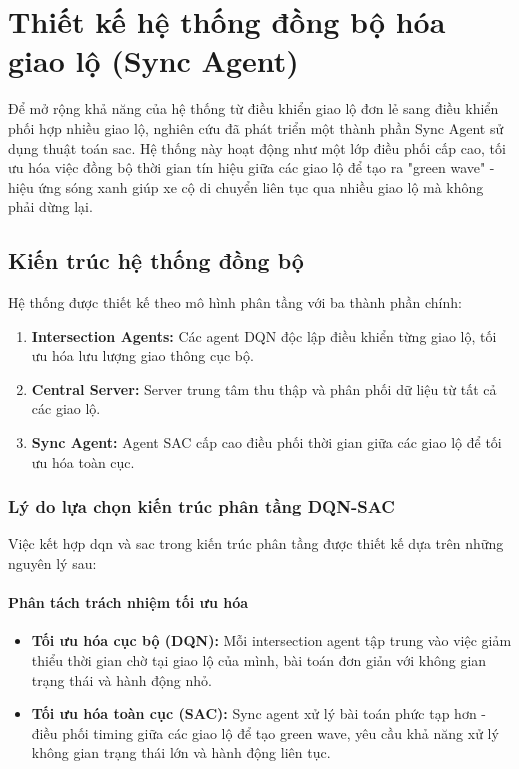 \section{Thiết kế hệ thống đồng bộ hóa giao lộ (Sync Agent)}

Để mở rộng khả năng của hệ thống từ điều khiển giao lộ đơn lẻ sang điều khiển phối hợp nhiều giao lộ, nghiên cứu đã phát triển một thành phần Sync Agent sử dụng thuật toán \ac{sac}. Hệ thống này hoạt động như một lớp điều phối cấp cao, tối ưu hóa việc đồng bộ thời gian tín hiệu giữa các giao lộ để tạo ra "green wave" - hiệu ứng sóng xanh giúp xe cộ di chuyển liên tục qua nhiều giao lộ mà không phải dừng lại.

\subsection{Kiến trúc hệ thống đồng bộ}
Hệ thống được thiết kế theo mô hình phân tầng với ba thành phần chính:

\begin{enumerate}
    \item \textbf{Intersection Agents:} Các agent DQN độc lập điều khiển từng giao lộ, tối ưu hóa lưu lượng giao thông cục bộ.

    \item \textbf{Central Server:} Server trung tâm thu thập và phân phối dữ liệu từ tất cả các giao lộ.

    \item \textbf{Sync Agent:} Agent SAC cấp cao điều phối thời gian giữa các giao lộ để tối ưu hóa toàn cục.
\end{enumerate}

\subsubsection{Lý do lựa chọn kiến trúc phân tầng DQN-SAC}
Việc kết hợp \ac{dqn} và \ac{sac} trong kiến trúc phân tầng được thiết kế dựa trên những nguyên lý sau:

\paragraph{Phân tách trách nhiệm tối ưu hóa}
\begin{itemize}
    \item \textbf{Tối ưu hóa cục bộ (DQN):} Mỗi intersection agent tập trung vào việc giảm thiểu thời gian chờ tại giao lộ của mình, bài toán đơn giản với không gian trạng thái và hành động nhỏ.
    \item \textbf{Tối ưu hóa toàn cục (SAC):} Sync agent xử lý bài toán phức tạp hơn - điều phối timing giữa các giao lộ để tạo green wave, yêu cầu khả năng xử lý không gian trạng thái lớn và hành động liên tục.
\end{itemize}

